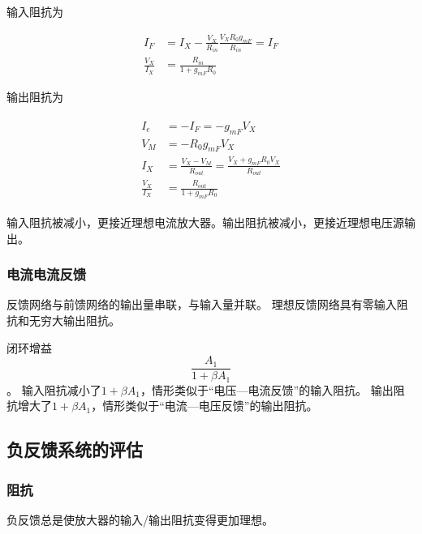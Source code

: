 \documentclass[cn,11pt,chinese,black,simple]{../elegantbook}
\begin{document}
输入阻抗为

\[\begin{aligned}
    I_{F} &=I_{X}-\frac{V_{X}}{R_{i n}} \frac{V_{X} R_{0} g_{m F}}{R_{i n}}=I_{F} \\
    \frac{V_{X}}{I_{X}} &=\frac{R_{i n}}{1+g_{m F} R_{0}}
\end{aligned}\]

输出阻抗为

\[\begin{array}{c}
    \begin{aligned}
        I_{e}&=-I_{F}=-g_{m F} V_{X} \\
        V_{M}&=-R_{0} g_{m F} V_{X} \\
        I_{X}&=\frac{V_{X}-V_{M}}{R_{o u t}}=\frac{V_{X}+g_{m F} R_{0} V_{X}}{R_{o u t}} \\
        \frac{V_{X}}{I_{X}}&=\frac{R_{o u t}}{1+g_{m F} R_{0}}
    \end{aligned}
\end{array}\]

输入阻抗被减小，更接近理想电流放大器。输出阻抗被减小，更接近理想电压源输出。

\subsubsection{电流电流反馈}


反馈网络与前馈网络的输出量串联，与输入量并联。
理想反馈网络具有零输入阻抗和无穷大输出阻抗。

闭环增益 \[\dfrac{A_1}{1 + \beta A_1}\] 。
输入阻抗减小了\(1 + \beta A_1\)，情形类似于“电压—电流反馈”的输入阻抗。
输出阻抗增大了\(1 + \beta A_1\)，情形类似于“电流—电压反馈”的输出阻抗。

\subsection{负反馈系统的评估}


\subsubsection{阻抗}

负反馈总是使放大器的输入/输出阻抗变得更加理想。
\end{document}
